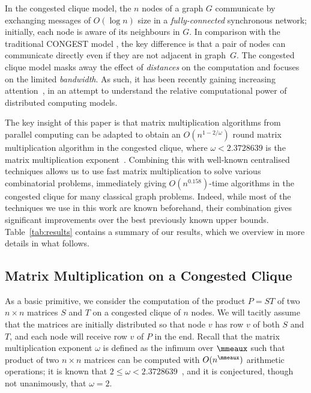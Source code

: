 In the congested clique model, the $n$ nodes of a graph $G$ communicate by exchanging messages of $O(\log{n})$ size in a \emph{fully-connected} synchronous network; initially, each node is aware of its neighbours in $G$. In comparison with the traditional CONGEST model \cite{peleg00}, the key difference is that a pair of nodes can communicate directly even if they are not adjacent in graph~$G$. The congested clique model masks away the effect of \emph{distances} on the computation and focuses on the limited \emph{bandwidth}. As such, it has been recently gaining increasing attention~\cite{PemmarajuS14_MST_logloglogn,tritri,drucker13,lenzen2013optimal,lotker05,nanongkai14, LenzenW11,patt-shamir11,hegeman14,HegemanP14}, in an attempt to understand the relative computational power of distributed computing models.

The key insight of this paper is that matrix multiplication algorithms from parallel computing can be adapted to obtain an $O(n^{1-2/\omega})$ round matrix multiplication algorithm in the congested clique, where $\omega < 2.3728639$ is the matrix multiplication exponent~\cite{legall2014powers}. Combining this with well-known centralised techniques allows us to use fast matrix multiplication to solve various combinatorial problems, immediately giving $O(n^{0.158})$-time algorithms in the congested clique for many classical graph problems. Indeed, while most of the techniques we use in this work are known beforehand, their combination gives significant improvements over the best previously known upper bounds. Table~\ref{tab:results} contains a summary of our results, which we overview in more details in what follows.

\subsection{Matrix Multiplication on a Congested Clique}

As a basic primitive, we consider the computation of the product $P = ST$ of two $n \times n$ matrices $S$ and $T$ on a congested clique of $n$ nodes. We will tacitly assume that the matrices are initially distributed so that node $v$ has row $v$ of both $S$ and $T$, and each node will receive row $v$ of $P$ in the end. Recall that the matrix multiplication exponent $\omega$ is defined as the infimum over $\mmeaux$ such that product of two $n \times n$ matrices can be computed with $O(n^{\mmeaux})$ arithmetic operations; it is known that $2 \le \omega < 2.3728639$~\cite{legall2014powers}, and it is conjectured, though not unanimously, that $\omega = 2$.

